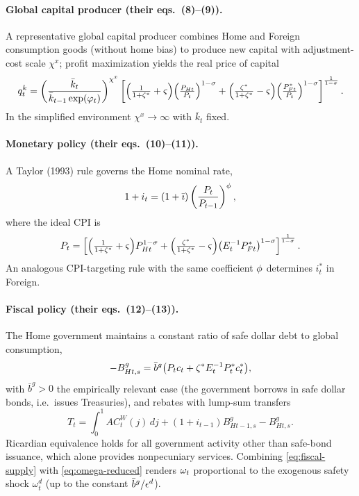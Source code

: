 \paragraph{Global capital producer (their eqs.~(8)--(9)).} A representative
global capital producer combines Home and Foreign consumption goods (without home
bias) to produce new capital with adjustment-cost scale $\chi^x$; profit
maximization yields the real price of capital
\begin{equation}
\label{eq:qk}
q^{k}_t=\left(\frac{\bar k_t}{\bar k_{t-1}\exp(\varphi_t)}\right)^{\chi^x}
\left[\Bigl(\tfrac{1}{1+\zeta^{*}}+\varsigma\Bigr)\Bigl(\tfrac{P_{Ht}}{P_t}\Bigr)^{1-\sigma}
+\Bigl(\tfrac{\zeta^{*}}{1+\zeta^{*}}-\varsigma\Bigr)\Bigl(\tfrac{P^{*}_{Ft}}{P_t}\Bigr)^{1-\sigma}\right]^{\frac1{1-\sigma}}.
\end{equation}
In the simplified environment $\chi^x\!\to\!\infty$ with $\bar k_t$ fixed.

\paragraph{Monetary policy (their eqs.~(10)--(11)).} A Taylor (1993) rule
governs the Home nominal rate,
\begin{equation}
\label{eq:taylor}
1+i_t=(1+\bar\imath)\left(\frac{P_t}{P_{t-1}}\right)^{\phi},
\end{equation}
where the ideal CPI is
\begin{equation}
\label{eq:cpi}
P_t=\left[\Bigl(\tfrac{1}{1+\zeta^{*}}+\varsigma\Bigr)P_{Ht}^{1-\sigma}
+\Bigl(\tfrac{\zeta^{*}}{1+\zeta^{*}}-\varsigma\Bigr)\bigl(E_t^{-1}P^{*}_{Ft}\bigr)^{1-\sigma}\right]^{\frac1{1-\sigma}}.
\end{equation}
An analogous CPI-targeting rule with the same coefficient $\phi$ determines
$i_t^{*}$ in Foreign.

\paragraph{Fiscal policy (their eqs.~(12)--(13)).} The Home government maintains
a constant ratio of safe dollar debt to global consumption,
\begin{equation}
\label{eq:fiscal-supply}
-B^g_{Ht,s}=\bar b^g\bigl(P_t c_t+\zeta^{*} E_t^{-1}P^{*}_t c^{*}_t\bigr),
\end{equation}
with $\bar b^g>0$ the empirically relevant case (the government borrows in safe
dollar bonds, i.e.\ issues Treasuries), and rebates with lump-sum transfers
\begin{equation}
\label{eq:fiscal-transfer}
T_t=\int_0^1 AC^W_t(j)\,dj+(1+i_{t-1})B^g_{Ht-1,s}-B^g_{Ht,s}.
\end{equation}
Ricardian equivalence holds for all government activity other than safe-bond
issuance, which alone provides nonpecuniary services. Combining
\eqref{eq:fiscal-supply} with \eqref{eq:omega-reduced} renders $\omega_t$
proportional to the exogenous safety shock $\omega^d_t$ (up to the
constant $\bar b^g/\epsilon^{d}$).

